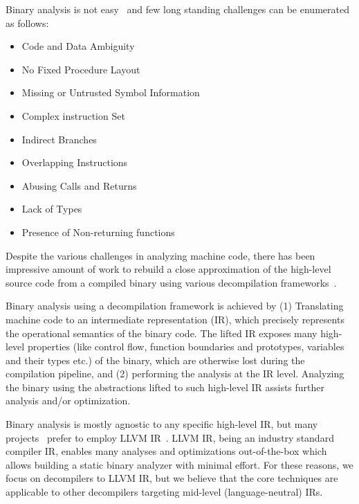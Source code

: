 Binary analysis is not easy~\cite{Meng:2016} and few long standing challenges
can be enumerated as follows:

\begin{itemize}
    \item Code and Data Ambiguity
    \item No Fixed Procedure Layout
    \item Missing or Untrusted Symbol Information
    \item Complex instruction Set
    \item Indirect Branches
    \item Overlapping Instructions
    \item Abusing Calls and Returns
    \item Lack of Types
    \item Presence of Non-returning functions
\end{itemize}

Despite the various challenges in analyzing machine code, there has been
impressive amount of work to rebuild a close approximation of the high-level
source code from a compiled binary using various decompilation
frameworks~\cite{McSema:Recon14,Remill,Angr1,BAP:CAV11,Radare2,FCD,BitBlaze:2008,hexray,Fokin:2011,eschulte2018bed,katz2018rnn,Schwartz:2013,IDA,mctoll,revgen}.

Binary analysis using a decompilation framework is achieved by (1) Translating
machine code to an intermediate representation (IR), which precisely represents
the operational semantics of the binary code. The lifted IR exposes many
high-level properties (like control flow, function boundaries and prototypes,
    variables and their types etc.) of the binary, which are otherwise lost
during the compilation pipeline, and (2) performing the analysis at the IR
level.  Analyzing the binary using the abstractions lifted to such high-level
IR assists further analysis and/or optimization. 

Binary analysis is mostly agnostic to any specific high-level IR, but many
projects~\cite{McSema:Recon14,Remill,FCD,reopt,mctoll} prefer to employ LLVM
IR~\cite{Lattner:2004}. LLVM IR, being an industry standard compiler IR,
  enables many analyses and optimizations out-of-the-box which allows building
  a static binary analyzer with minimal effort. For these reasons, we focus on
  decompilers to LLVM IR, but we believe that the core techniques are
  applicable to other decompilers targeting mid-level (language-neutral) IRs.   

